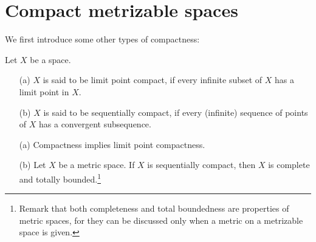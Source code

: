 \section{Compact metrizable spaces}

We first introduce some other types of compactness:
\begin{defi}
    Let $X$ be a space.
    \begin{enumerate}
        \item[(a)]
        {
            $X$ is said to be limit point compact, if every infinite subset of $X$ has a limit point in $X$.
        }
        \item[(b)]
        {
            $X$ is said to be sequentially compact, if every (infinite) sequence of points of $X$ has a convergent subsequence.
        }
    \end{enumerate}
\end{defi}
\begin{rmk}
    \begin{enumerate}
        \item[(a)]
        {
            Compactness implies limit point compactness.   
        }
        \item[(b)]
        {
            Let $X$ be a metric space.
            If $X$ is sequentially compact, then $X$ is complete and totally bounded.\footnote{Remark that both completeness and total boundedness are properties of metric spaces, for they can be discussed only when a metric on a metrizable space is given.}
        }
    \end{enumerate}
\end{rmk}

